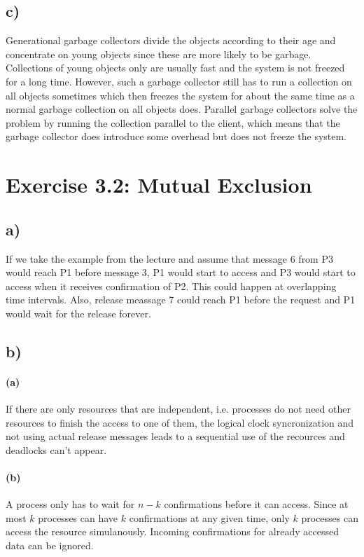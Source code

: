 \documentclass[12pt,a4paper]{article}
\begin{document}
\subsection*{c)} Generational garbage collectors divide the objects according to their age and concentrate on young objects since these are more likely to be garbage. Collections of young objects only are usually fast and the system is not freezed for a long time. However, such a garbage collector still has to run a collection on all objects sometimes which then freezes the system for about the same time as a normal garbage collection on all objects does.
Parallel garbage collectors solve the problem by running the collection parallel to the client, which means that the garbage collector does introduce some overhead but does not freeze the system.

\section*{Exercise 3.2: Mutual Exclusion}
  \subsection*{a)} 
  If we take the example from the lecture and assume that message 6 from P3 would reach P1 before message 3, P1 would start to access and P3 would start to access when it receives confirmation of P2. This could happen at overlapping time intervals. Also, release meassage 7 could reach P1 before the request and P1 would wait for the release
  forever.
  \subsection*{b)} %
    \paragraph*{(a)} 
    If there are only resources that are independent, i.e. processes do not need other resources to finish the access to one of them, the logical clock
     syncronization and not using actual release messages leads to a sequential use of the recources and deadlocks can't appear.
    \paragraph*{(b)} 
    A process only has to wait for $n-k$ confirmations before it can access. Since at most $k$ processes can have $k$ confirmations at any given time, only $k$ processes can access the resource simulanously. Incoming confirmations for already accessed data can be ignored.
\end{document}
